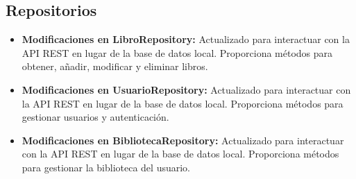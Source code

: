 \documentclass[a4paper,11pt]{report}
\begin{document}
      \subsection{Repositorios}
        \begin{itemize}
          \item \textbf{Modificaciones en LibroRepository:} Actualizado para interactuar con la API REST en lugar de la base de datos local. Proporciona métodos para obtener, añadir, modificar y eliminar libros.
          \item \textbf{Modificaciones en UsuarioRepository:} Actualizado para interactuar con la API REST en lugar de la base de datos local. Proporciona métodos para gestionar usuarios y autenticación.
          \item \textbf{Modificaciones en BibliotecaRepository:} Actualizado para interactuar con la API REST en lugar de la base de datos local. Proporciona métodos para gestionar la biblioteca del usuario.
        \end{itemize}
\end{document}

